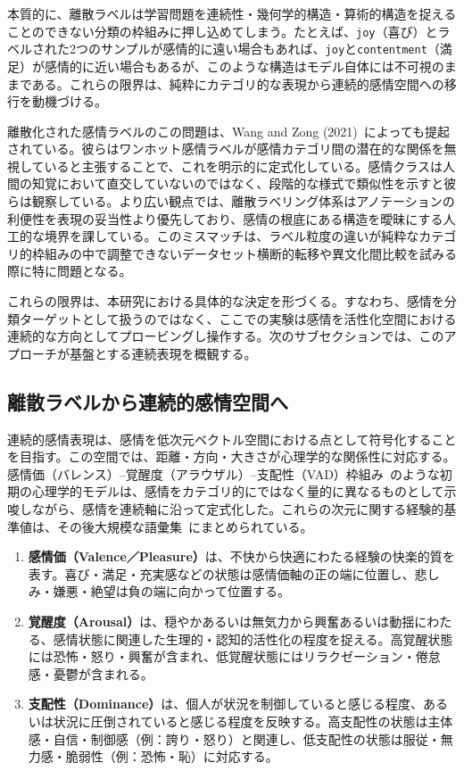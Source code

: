 本質的に、離散ラベルは学習問題を連続性・幾何学的構造・算術的構造を捉えることのできない分類の枠組みに押し込めてしまう。たとえば、\texttt{joy}（喜び）とラベルされた2つのサンプルが感情的に遠い場合もあれば、\texttt{joy}と\texttt{contentment}（満足）が感情的に近い場合もあるが、このような構造はモデル自体には不可視のままである。これらの限界は、純粋にカテゴリ的な表現から連続的感情空間への移行を動機づける。

離散化された感情ラベルのこの問題は、Wang and Zong (2021)~\cite{wang-zong-2021-distributed}によっても提起されている。彼らはワンホット感情ラベルが感情カテゴリ間の潜在的な関係を無視していると主張することで、これを明示的に定式化している。感情クラスは人間の知覚において直交していないのではなく、段階的な様式で類似性を示すと彼らは観察している。より広い観点では、離散ラベリング体系はアノテーションの利便性を表現の妥当性より優先しており、感情の根底にある構造を曖昧にする人工的な境界を課している。このミスマッチは、ラベル粒度の違いが純粋なカテゴリ的枠組みの中で調整できないデータセット横断的転移や異文化間比較を試みる際に特に問題となる。

これらの限界は、本研究における具体的な決定を形づくる。すなわち、感情を分類ターゲットとして扱うのではなく、ここでの実験は感情を活性化空間における連続的な方向としてプロービングし操作する。次のサブセクションでは、このアプローチが基盤とする連続表現を概観する。

\subsection{離散ラベルから連続的感情空間へ}

連続的感情表現は、感情を低次元ベクトル空間における点として符号化することを目指す。この空間では、距離・方向・大きさが心理学的な関係性に対応する。感情価（バレンス）--覚醒度（アラウザル）--支配性（VAD）枠組み~\cite{MehrabianRussell1974}のような初期の心理学的モデルは、感情をカテゴリ的にではなく量的に異なるものとして示唆しながら、感情を連続軸に沿って定式化した。これらの次元に関する経験的基準値は、その後大規模な語彙集~\cite{mohammad2025nrcvadlexiconv2}にまとめられている。

\begin{enumerate}
    \item \textbf{感情価（Valence／Pleasure）}は、不快から快適にわたる経験の快楽的質を表す。喜び・満足・充実感などの状態は感情価軸の正の端に位置し、悲しみ・嫌悪・絶望は負の端に向かって位置する。
    \item \textbf{覚醒度（Arousal）}は、穏やかあるいは無気力から興奮あるいは動揺にわたる、感情状態に関連した生理的・認知的活性化の程度を捉える。高覚醒状態には恐怖・怒り・興奮が含まれ、低覚醒状態にはリラクゼーション・倦怠感・憂鬱が含まれる。
    \item \textbf{支配性（Dominance）}は、個人が状況を制御していると感じる程度、あるいは状況に圧倒されていると感じる程度を反映する。高支配性の状態は主体感・自信・制御感（例：誇り・怒り）と関連し、低支配性の状態は服従・無力感・脆弱性（例：恐怖・恥）に対応する。
\end{enumerate}

